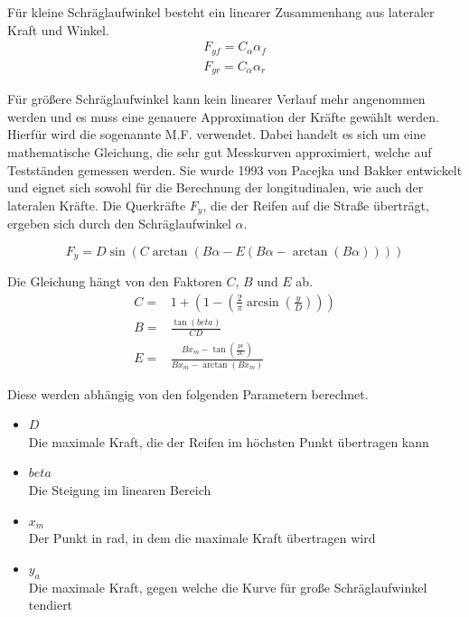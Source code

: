 \documentclass{like}
\begin{document}
Für kleine Schräglaufwinkel besteht ein linearer Zusammenhang aus lateraler Kraft und Winkel.
\begin{eqnarray}
F_{yf} = C_\alpha \alpha_f \\
F_{yr} = C_\alpha \alpha_r
\end{eqnarray}

Für größere Schräglaufwinkel kann kein linearer Verlauf mehr angenommen werden und es muss eine genauere Approximation der Kräfte gewählt werden. Hierfür wird die sogenannte \ac{M.F.}  \cite{magicFormula} verwendet. Dabei handelt es sich um eine mathematische Gleichung, die sehr gut Messkurven approximiert, welche auf Testständen gemessen werden.
Sie wurde 1993 von Pacejka und Bakker entwickelt und eignet sich sowohl für die Berechnung der longitudinalen, wie auch der lateralen Kräfte. 
Die Querkräfte $F_y$, die der Reifen auf die Straße überträgt, ergeben sich durch den Schräglaufwinkel $\alpha$.

\begin{equation}
F_y =  D\sin(C\arctan(B\alpha - E(B\alpha - \arctan(B\alpha))))  \label{eq:magicF} 
\end{equation}

Die Gleichung hängt von den Faktoren \(C\), \(B\) und \(E\) ab. 
\begin{eqnarray}
C =& 1 + \left(1- \left(\frac{2}{\pi} \arcsin \left(\frac{y}{D} \right) \right) \right) \\
B =& \frac{\tan(beta)}{CD} \\
E =& \frac{ B  x_m - \tan \left(\frac{pi}{2 C} \right)}{Bx_m - \arctan(Bx_m)}
\end{eqnarray}


Diese werden abhängig von den folgenden Parametern berechnet.

\begin{itemize}
	\item $D$ \\	
	Die maximale Kraft, die der Reifen im höchsten Punkt übertragen kann
	\item $beta$\\
	Die Steigung im linearen Bereich 
	\item $x_m$ \\
	Der Punkt in rad, in dem die maximale Kraft übertragen wird
	\item $y_a$ \\
	Die maximale Kraft, gegen welche die Kurve für große Schräglaufwinkel tendiert 
\end{itemize}
\end{document}
